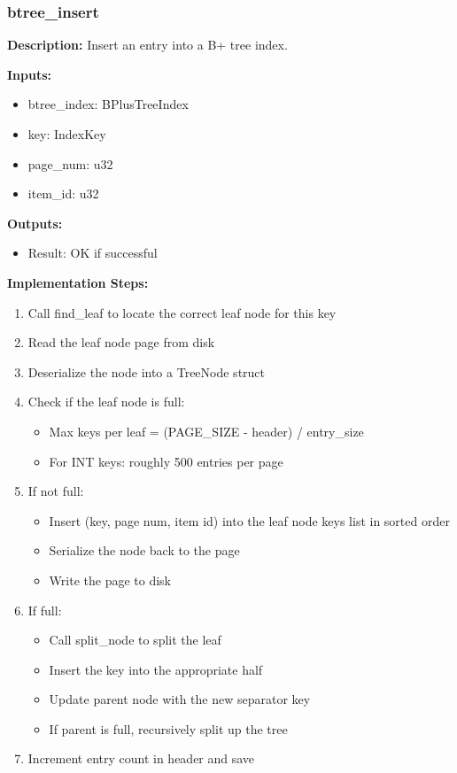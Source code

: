\documentclass[11pt,a4paper]{article}
\begin{document}
\subsubsection{btree\_insert}

\textbf{Description:} Insert an entry into a B+ tree index.

\textbf{Inputs:}
\begin{itemize}
\item btree\_index: BPlusTreeIndex
\item key: IndexKey
\item page\_num: u32
\item item\_id: u32
\end{itemize}

\textbf{Outputs:}
\begin{itemize}
\item Result: OK if successful
\end{itemize}

\textbf{Implementation Steps:}
\begin{enumerate}
\item Call find\_leaf to locate the correct leaf node for this key
\item Read the leaf node page from disk
\item Deserialize the node into a TreeNode struct
\item Check if the leaf node is full:
    \begin{itemize}
    \item Max keys per leaf = (PAGE\_SIZE - header) / entry\_size
    \item For INT keys: roughly 500 entries per page
    \end{itemize}
\item If not full:
    \begin{itemize}
    \item Insert (key, page num, item id) into the leaf node keys list in sorted order
    \item Serialize the node back to the page
    \item Write the page to disk
    \end{itemize}
\item If full:
    \begin{itemize}
    \item Call split\_node to split the leaf
    \item Insert the key into the appropriate half
    \item Update parent node with the new separator key
    \item If parent is full, recursively split up the tree
    \end{itemize}
\item Increment entry count in header and save
\end{enumerate}
\end{document}
